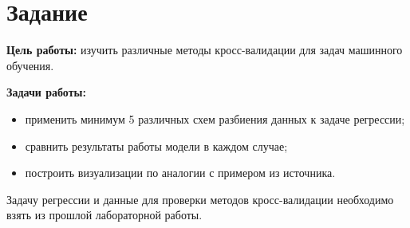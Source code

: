 \section{Задание}

\textbf{Цель работы:} изучить различные методы кросс-валидации для задач машинного обучения.

\textbf{Задачи работы:}
\begin{itemize}
    \item применить минимум 5 различных схем разбиения данных к задаче регрессии;
    \item сравнить результаты работы модели в каждом случае;
    \item построить визуализации по аналогии с примером из источника.\cite{github_cross_validation_techniques}
\end{itemize}

Задачу регрессии и данные для проверки методов кросс-валидации необходимо взять из прошлой лабораторной работы.\cite{github_lab_1}